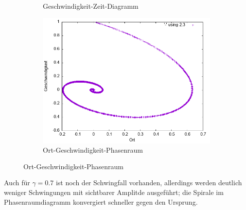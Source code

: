 \documentclass[
    oneside,
    ngerman,
    footinclude=false,
    captions=tableheading,
    DIV=12
]{scrartcl}
\begin{document}
\begin{figure}[H]
\begin{subfigure}[b]{0.45\textwidth}
                        \caption{Geschwindigkeit-Zeit-Diagramm}
                        \label{fig:VVA1(a)-001-0.7-v}
                    \end{subfigure}
                    \begin{subfigure}[b]{0.45\textwidth}
                        \centering
                        \includegraphics[width=\textwidth]{Bilddateien/VVA1(b)-001-0.7-xv.png}
                        \caption{Ort-Geschwindigkeit-Phasenraum}
                        \label{fig:VVA1(a)-001-0.7-xv}
                    \end{subfigure}
                \end{figure}
                Auch für $\gamma=0.7$ ist noch der Schwingfall vorhanden, allerdings werden deutlich weniger Schwingungen mit sichtbarer Amplitde ausgeführt; die Spirale im Phasenraumdiagramm konvergiert schneller gegen den Ursprung.
            
\end{document}
